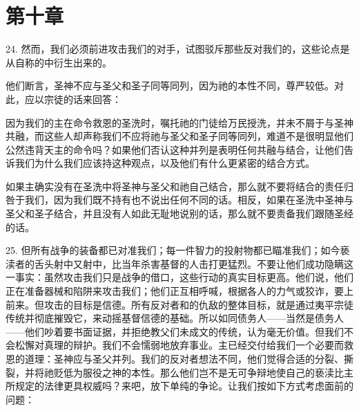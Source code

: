 
\section{第十章}

\par

24. 然而，我们必须前进攻击我们的对手，试图驳斥那些反对我们的，这些论点是从自称的中衍生出来的。\par

他们断言，圣神不应与圣父和圣子同等同列，因为祂的本性不同，尊严较低。对此，应以宗徒的话来回答：\par

因为我们的主在命令救恩的圣洗时，嘱托祂的门徒给万民授洗，并未不屑于与圣神共融，而这些人却声称我们不应将祂与圣父和圣子同等同列，难道不是很明显他们公然违背天主的命令吗？如果他们否认这种并列是表明任何共融与结合，让他们告诉我们为什么我们应该持这种观点，以及他们有什么更紧密的结合方式。\par

如果主确实没有在圣洗中将圣神与圣父和祂自己结合，那么就不要将结合的责任归咎于我们，因为我们既不持有也不说出任何不同的话。相反，如果在圣洗中圣神与圣父和圣子结合，并且没有人如此无耻地说别的话，那么就不要责备我们跟随圣经的话。\par

25. 但所有战争的装备都已对准我们；每一件智力的投射物都已瞄准我们；如今亵渎者的舌头射中又射中，比当年杀害基督的人击打更猛烈。不要让他们成功隐瞒这一事实：虽然攻击我们只是战争的借口，这些行动的真实目标更高。他们说，他们正在准备器械和陷阱来攻击我们；他们正互相呼喊，根据各人的力气或狡诈，要上前来。但攻击的目标是信德。所有反对者和的仇敌的整体目标，就是通过夷平宗徒传统并彻底摧毁它，来动摇基督信德的基础。所以如同债务人——当然是债务人——他们吵着要书面证据，并拒绝教父们未成文的传统，认为毫无价值。但我们不会松懈对真理的辩护。我们不会懦弱地放弃事业。主已经交付给我们一个必要而救恩的道理：圣神应与圣父并列。我们的反对者想法不同，他们觉得合适的分裂、撕裂，并将祂贬低为服役之神的本性。那么他们岂不是无可争辩地使自己的亵渎比主所规定的法律更具权威吗？来吧，放下单纯的争论。让我们按如下方式考虑面前的问题：\par

